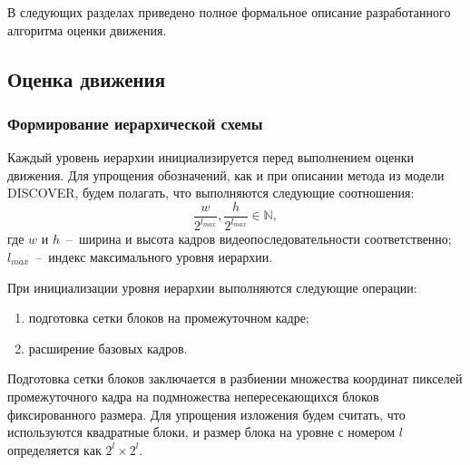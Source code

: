 В следующих разделах приведено полное формальное описание разработанного алгоритма оценки движения.

\subsection{Оценка движения}
\label{chap2:4:1}

\subsubsection{Формирование иерархической схемы}
\label{chap2:4:1:1}

Каждый уровень иерархии инициализируется перед выполнением оценки движения. Для упрощения обозначений, как и при описании метода из модели DISCOVER, будем полагать, что выполняются следующие соотношения:
\begin{equation*}
\frac{w}{2^{l_{max}}}, \frac{h}{2^{l_{max}}} \in \mathbb{N},
\end{equation*}
где $w$ и $h$~--~ширина и высота кадров видеопоследовательности соответственно; $l_{max}$~--~индекс максимального уровня иерархии.

При инициализации уровня иерархии выполняются следующие операции:
\begin{enumerate}
\item подготовка сетки блоков на промежуточном кадре;
\item расширение базовых кадров.
\end{enumerate}

Подготовка сетки блоков заключается в разбиении множества координат пикселей промежуточного кадра на подмножества непересекающихся блоков фиксированного размера. Для упрощения изложения будем считать, что используются квадратные блоки, и размер блока на уровне с номером $l$ определяется как $2^l\times2^l$.

